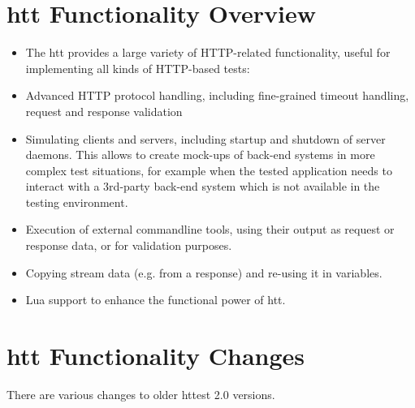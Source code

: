 \chapter{htt Functionality Overview}
\label{chap:functionality}

\begin{itemize}

 \item The htt provides a large variety of HTTP-related functionality, useful for 
implementing all kinds of HTTP-based tests:

 \item Advanced HTTP protocol handling, including fine-grained timeout handling, 
request and response validation

 \item Simulating clients and servers, including startup and shutdown of server 
daemons. This allows to create mock-ups of back-end systems in more complex 
test situations, for example when the tested application needs to interact
with a 3rd-party back-end system which is not available in the testing 
environment.

 \item Execution of external commandline tools, using their output as request 
or response data, or for validation purposes.

 \item Copying stream data (e.g. from a response) and re-using it in variables.

 \item Lua support to enhance the functional power of htt.

\end{itemize}

\chapter{htt Functionality Changes}
\label{chap:Changes}

There are various changes to older httest 2.0 versions.

